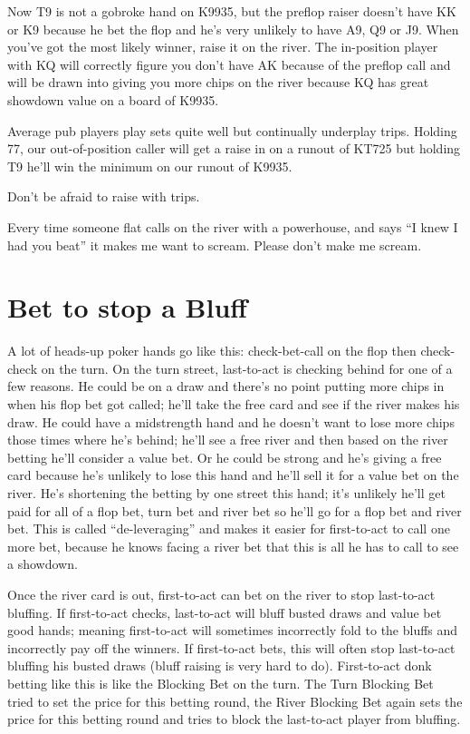 Now T9 is not a gobroke hand on K9935, but the preflop raiser doesn't
have KK or K9 because he bet the flop and he's very unlikely to have
A9, Q9 or J9. When you've got the most likely winner, raise it on
the river. The in-position player with KQ will correctly figure you
don't have AK because of the preflop call and will be drawn into
giving you more chips on the river because KQ has great showdown value
on a board of K9935.

Average pub players play sets quite well but continually underplay
trips. Holding 77, our out-of-position caller will get a raise in on a
runout of KT725 but holding T9 he'll win the minimum on our runout of
K9935.

Don't be afraid to raise with trips.

Every time someone flat calls on the river with a powerhouse, and
says ``I knew I had you beat'' it makes me want to scream. Please
don't make me scream.

\section{Bet to stop a Bluff}

A lot of heads-up poker hands go like this: check-bet-call on the flop
then check-check on the turn. On the turn street, last-to-act
is checking behind for one of a few reasons. He could be on a draw
and there's no point putting more chips in when his flop bet got
called; he'll take the free card and see if the river makes his draw.
He could have a midstrength hand and he doesn't want to lose more chips
those times where he's behind; he'll see a free river and then based
on the river betting he'll consider a value bet. Or he could be
strong and he's giving a free card because he's unlikely to lose
this hand and he'll sell it for a value bet on the river. He's
shortening the betting by one street this hand; it's unlikely he'll
get paid for all of a flop bet, turn bet and river bet so he'll go for
a flop bet and river bet. This is called ``de-leveraging'' and makes
it easier for first-to-act to call one more bet, because he knows
facing a river bet that this is all he has to call to see a showdown.

Once the river card is out, first-to-act can bet on the river
to stop last-to-act bluffing. If first-to-act checks, last-to-act
will bluff busted draws and value bet good hands; meaning first-to-act
will sometimes incorrectly fold to the bluffs and incorrectly pay
off the winners. If first-to-act bets, this will often
stop last-to-act bluffing his busted draws (bluff raising is
very hard to do). First-to-act donk betting like this is like
the Blocking Bet on the turn. The Turn Blocking Bet tried to set
the price for this betting round, the River Blocking Bet again
sets the price for this betting round and tries to block the
last-to-act player from bluffing.

